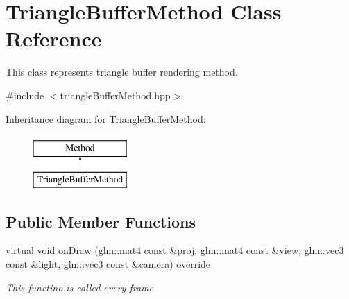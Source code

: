\hypertarget{classTriangleBufferMethod}{}\section{Triangle\+Buffer\+Method Class Reference}
\label{classTriangleBufferMethod}


This class represents triangle buffer rendering method.  




{\ttfamily \#include $<$triangle\+Buffer\+Method.\+hpp$>$}

Inheritance diagram for Triangle\+Buffer\+Method\+:\begin{figure}[H]
\begin{center}
\leavevmode
\includegraphics[height=2.000000cm]{classTriangleBufferMethod}
\end{center}
\end{figure}
\subsection*{Public Member Functions}
\begin{DoxyCompactItemize}
\item 
virtual void \hyperlink{classTriangleBufferMethod_ae4339a5479f2f4fe9ca5964d5f7f1f74}{on\+Draw} (glm\+::mat4 const \&proj, glm\+::mat4 const \&view, glm\+::vec3 const \&light, glm\+::vec3 const \&camera) override
\begin{DoxyCompactList}\small\item\em This functino is called every frame. \end{DoxyCompactList}\end{DoxyCompactItemize}
